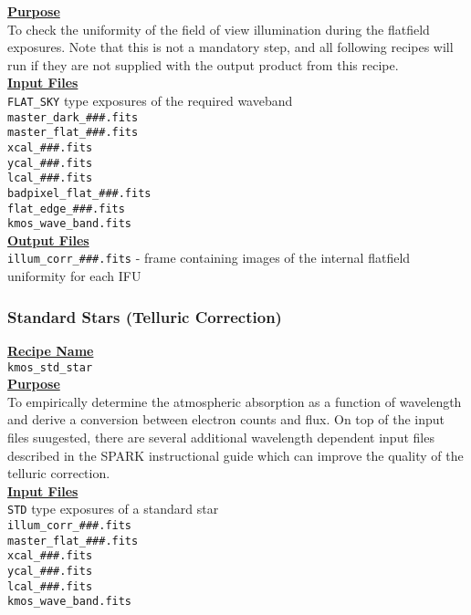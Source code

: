 \documentclass{literature}
\begin{document}
\noindent
\textbf{\underline{Purpose}} \\	
\noindent 
To check the uniformity of the field of view illumination during the flatfield exposures. Note that this is not a mandatory step, and all following recipes will run if they are not supplied with the output product from this recipe.\\

\noindent
\textbf{\underline{Input Files}} \\	
 {\tt{FLAT\_SKY}} type exposures of the required waveband \\ 
\noindent
{\tt{master\_dark\_\#\#\#.fits}}\\
\noindent
{\tt{master\_flat\_\#\#\#.fits}}\\
\noindent
{\tt{xcal\_\#\#\#.fits}}\\
\noindent
{\tt{ycal\_\#\#\#.fits}}\\
\noindent
{\tt{lcal\_\#\#\#.fits}}\\
\noindent
{\tt{badpixel\_flat\_\#\#\#.fits}}\\
\noindent
{\tt{flat\_edge\_\#\#\#.fits}}\\
\noindent
{\tt{kmos\_wave\_band.fits}}\\ 

\noindent
\textbf{\underline{Output Files}} \\	
\noindent
{\tt{illum\_corr\_\#\#\#.fits}} - frame containing images of the internal flatfield uniformity for each IFU \\

\subsubsection{Standard Stars (Telluric Correction)}\label{subsubsec:telluric_cor}
\textbf{\underline{Recipe Name}} \\		
\noindent
{\tt{kmos\_std\_star}} \\

\noindent
\textbf{\underline{Purpose}} \\	
\noindent 
To empirically determine the atmospheric absorption as a function of wavelength and derive a conversion between electron counts and flux. On top of the input files suugested, there are several additional wavelength dependent input files described in the SPARK instructional guide which can improve the quality of the telluric correction.  \\

\noindent
\textbf{\underline{Input Files}} \\	
 {\tt{STD}} type exposures of a standard star \\ 
\noindent
{\tt{illum\_corr\_\#\#\#.fits}}\\
\noindent
{\tt{master\_flat\_\#\#\#.fits}}\\
\noindent
{\tt{xcal\_\#\#\#.fits}}\\
\noindent
{\tt{ycal\_\#\#\#.fits}}\\
\noindent
{\tt{lcal\_\#\#\#.fits}}\\
\noindent
{\tt{kmos\_wave\_band.fits}}\\
\end{document}
